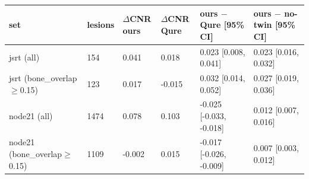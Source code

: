 \begin{tabular}{llllll}
\toprule
set & lesions & $\Delta$CNR ours & $\Delta$CNR Qure & ours $-$ Qure [95\% CI] & ours $-$ no-twin [95\% CI] \\
\midrule
jsrt (all) & 154 & 0.041 & 0.018 & 0.023 [0.008, 0.041] & 0.023 [0.016, 0.032] \\
jsrt (bone\_overlap$\geq$0.15) & 123 & 0.017 & -0.015 & 0.032 [0.014, 0.052] & 0.027 [0.019, 0.036] \\
node21 (all) & 1474 & 0.078 & 0.103 & -0.025 [-0.033, -0.018] & 0.012 [0.007, 0.016] \\
node21 (bone\_overlap$\geq$0.15) & 1109 & -0.002 & 0.015 & -0.017 [-0.026, -0.009] & 0.007 [0.003, 0.012] \\
\bottomrule
\end{tabular}
